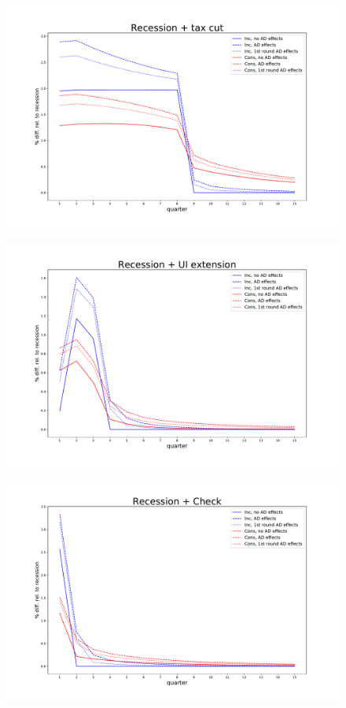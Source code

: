 \documentclass[]{article}
\begin{document}
\begin{figure}
	\centering
	\includegraphics[width=\linewidth]{../Full_Run_3Educ_Nov4th/recession_taxcut_relrecession}
	\caption{}
	\label{fig:recessiontaxcutrelrecession}
\end{figure}
\begin{figure}
	\centering
	\includegraphics[width=\linewidth]{../Full_Run_3Educ_Nov4th/recession_UI_relrecession}
	\caption{}
	\label{fig:recessionuirelrecession}
\end{figure}
\begin{figure}
	\centering
	\includegraphics[width=\linewidth]{../Full_Run_3Educ_Nov4th/recession_Check_relrecession}
	\caption{}
	\label{fig:recessioncheckrelrecession}
\end{figure}
\end{document}
